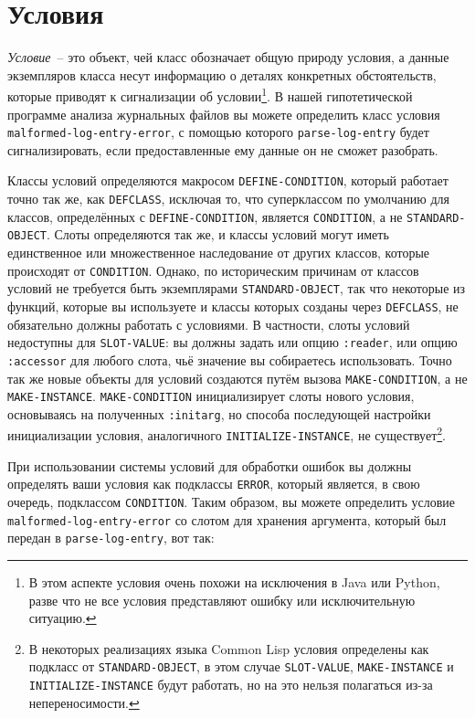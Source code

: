 \section{Условия}

\textit{Условие}~-- это объект, чей класс обозначает общую природу условия, а данные
экземпляров класса несут информацию о деталях конкретных обстоятельств, которые приводят к
сигнализации об условии\footnote{В этом аспекте условия очень похожи на исключения в Java
  или Python, разве что не все условия представляют ошибку или исключительную ситуацию.}. В
нашей гипотетической программе анализа журнальных файлов вы можете определить класс
условия \lstinline{malformed-log-entry-error}, с помощью которого \lstinline{parse-log-entry} будет
сигнализировать, если предоставленные ему данные он не сможет разобрать.

Классы условий определяются макросом \lstinline{DEFINE-CONDITION}, который работает точно так
же, как \lstinline{DEFCLASS}, исключая то, что суперклассом по умолчанию для классов,
определённых с \lstinline{DEFINE-CONDITION}, является \lstinline{CONDITION}, а не
\lstinline{STANDARD-OBJECT}. Слоты определяются так же, и классы условий могут иметь
единственное или множественное наследование от других классов, которые происходят от
\lstinline{CONDITION}. Однако, по историческим причинам от классов условий не требуется быть
экземплярами \lstinline{STANDARD-OBJECT}, так что некоторые из функций, которые вы используете
и классы которых созданы через \lstinline{DEFCLASS}, не обязательно должны работать с
условиями. В частности, слоты условий недоступны для \lstinline{SLOT-VALUE}: вы должны задать
или опцию \lstinline{:reader}, или опцию \lstinline{:accessor} для любого слота, чьё значение вы
собираетесь использовать. Точно так же новые объекты для условий создаются путём вызова
\lstinline{MAKE-CONDITION}, а не \lstinline{MAKE-INSTANCE}. \lstinline{MAKE-CONDITION} инициализирует
слоты нового условия, основываясь на полученных \lstinline{:initarg}, но способа последующей
настройки инициализации условия, аналогичного \lstinline{INITIALIZE-INSTANCE}, не
существует\footnote{В некоторых реализациях языка Common Lisp условия определены как
  подкласс от \lstinline{STANDARD-OBJECT}, в этом случае \lstinline{SLOT-VALUE},
  \lstinline{MAKE-INSTANCE} и \lstinline{INITIALIZE-INSTANCE} будут работать, но на это нельзя
  полагаться из-за непереносимости.}.

При использовании системы условий для обработки ошибок вы должны определять ваши условия
как подклассы \lstinline{ERROR}, который является, в свою очередь, подклассом
\lstinline{CONDITION}. Таким образом, вы можете определить условие
\lstinline{malformed-log-entry-error} со слотом для хранения аргумента, который был передан в
\lstinline{parse-log-entry}, вот так:

